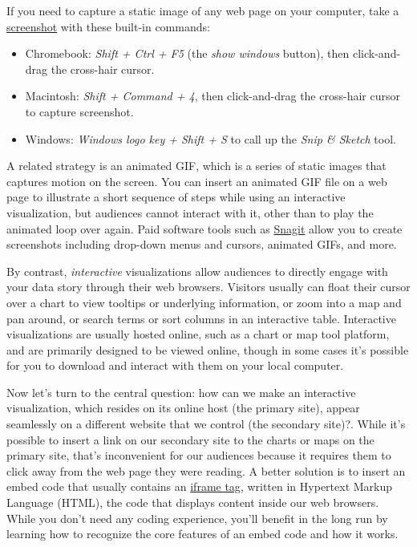 \documentclass[
  english,
]{book}
\providecommand{\tightlist}{%
  \setlength{\itemsep}{0pt}\setlength{\parskip}{0pt}}
\begin{document}
If you need to capture a static image of any web page on your computer, take a \href{https://en.wikipedia.org/wiki/Screenshot}{screenshot} with these built-in commands:

\begin{itemize}
\tightlist
\item
  Chromebook: \emph{Shift + Ctrl + F5} (the \emph{show windows} button), then click-and-drag the cross-hair cursor.
\item
  Macintosh: \emph{Shift + Command + 4}, then click-and-drag the cross-hair cursor to capture screenshot.
\item
  Windows: \emph{Windows logo key + Shift + S} to call up the \emph{Snip \& Sketch} tool.
\end{itemize}

A related strategy is an animated GIF, which is a series of static images that captures motion on the screen. You can insert an animated GIF file on a web page to illustrate a short sequence of steps while using an interactive visualization, but audiences cannot interact with it, other than to play the animated loop over again. Paid software tools such as \href{https://www.techsmith.com/screen-capture.html}{Snagit} allow you to create screenshots including drop-down menus and cursors, animated GIFs, and more.

By contrast, \emph{interactive} visualizations allow audiences to directly engage with your data story through their web browsers. Visitors usually can float their cursor over a chart to view tooltips or underlying information, or zoom into a map and pan around, or search terms or sort columns in an interactive table. Interactive visualizations are usually hosted online, such as a chart or map tool platform, and are primarily designed to be viewed online, though in some cases it's possible for you to download and interact with them on your local computer.

Now let's turn to the central question: how can we make an interactive visualization, which resides on its online host (the primary site), appear seamlessly on a different website that we control (the secondary site)?. While it's possible to insert a link on our secondary site to the charts or maps on the primary site, that's inconvenient for our audiences because it requires them to click away from the web page they were reading. A better solution is to insert an embed code that usually contains an \href{https://www.w3schools.com/tags/tag_iframe.asp}{iframe tag}, written in Hypertext Markup Language (HTML), the code that displays content inside our web browsers. While you don't need any coding experience, you'll benefit in the long run by learning how to recognize the core features of an embed code and how it works.
\end{document}

